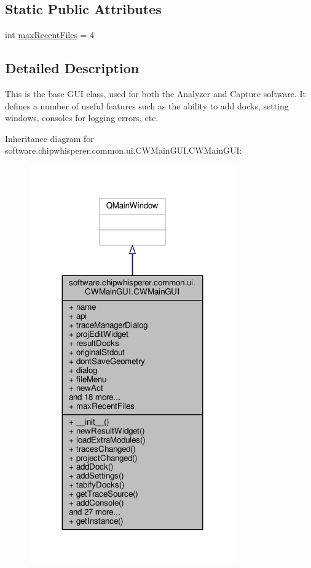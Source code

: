 \subsection*{Static Public Attributes}
\begin{DoxyCompactItemize}
\item 
int \hyperlink{classsoftware_1_1chipwhisperer_1_1common_1_1ui_1_1CWMainGUI_1_1CWMainGUI_a5e474fceda40fbadd37645c6c9c03abb}{max\+Recent\+Files} = 4
\end{DoxyCompactItemize}


\subsection{Detailed Description}
\begin{DoxyVerb}This is the base GUI class, used for both the Analyzer and Capture software. It defines a number of
useful features such as the ability to add docks, setting windows, consoles for logging errors, etc.
\end{DoxyVerb}
 

Inheritance diagram for software.\+chipwhisperer.\+common.\+ui.\+C\+W\+Main\+G\+U\+I.\+C\+W\+Main\+G\+U\+I\+:\nopagebreak
\begin{figure}[H]
\begin{center}
\leavevmode
\includegraphics[width=251pt]{d5/d6e/classsoftware_1_1chipwhisperer_1_1common_1_1ui_1_1CWMainGUI_1_1CWMainGUI__inherit__graph}
\end{center}
\end{figure}


